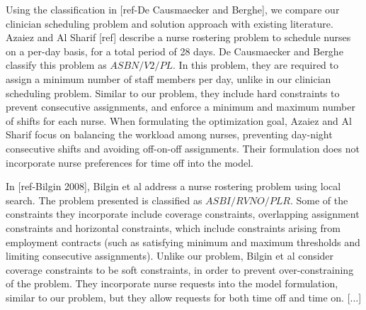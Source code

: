 Using the classification in [ref-De Causmaecker and Berghe], we compare our clinician
scheduling problem and solution approach with existing literature. Azaiez and Al Sharif [ref]
describe a nurse rostering problem to schedule nurses on a per-day basis, for a total period
of 28 days. De Causmaecker and Berghe classify this problem as $ASBN/V2/PL$.
In this problem, they are required to assign a minimum number of staff members
per day, unlike in our clinician scheduling problem. Similar to our problem, they include
hard constraints to prevent consecutive assignments, and enforce a minimum and maximum 
number of shifts for each nurse. When formulating the optimization goal, Azaiez and Al Sharif
focus on balancing the workload among nurses, preventing day-night consecutive shifts and avoiding
off-on-off assignments. Their formulation does not incorporate nurse preferences
for time off into the model. 

In [ref-Bilgin 2008], Bilgin et al address a nurse rostering problem using local search. 
The problem presented is classified as $ASBI/RVNO/PLR$.
Some of the constraints they incorporate include coverage constraints, overlapping assignment
constraints and horizontal constraints, which include constraints arising from employment contracts
(such as satisfying minimum and maximum thresholds and limiting consecutive assignments). Unlike
our problem, Bilgin et al consider coverage constraints to be soft constraints, in order to prevent
over-constraining of the problem. They incorporate nurse requests into the model formulation,
similar to our problem, but they allow requests for both time off and time on.
[...]
